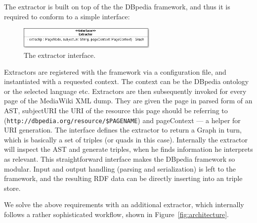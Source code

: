 The extractor is built on top of the the DBpedia framework, and thus it is required to conform to a simple interface:

\begin{figure}[tb]
\centering
\includegraphics[width=0.6\textwidth]{./images/interface.png}
\caption{The extractor interface.}
\label{fig:interface}
\end{figure}

Extractors are registered with the framework via a configuration file, and instantiated with a requested context. The context can be the DBpedia ontology or the selected language etc. Extractors are then subsequently invoked for every page of the MediaWiki XML dump. They are given the page in parsed form of an AST, subjectURI the URI of the resource this page should be referring to (\texttt{http://dbpedia.org/resource/\$PAGENAME}) and pageContext --- a helper for URI generation. The interface defines the extractor to return a Graph in turn, which is basically a set of triples (or quads in this case). Internally the extractor will inspect the AST and generate triples, when he finds information he interprets as relevant. This straightforward interface makes the DBpedia framework so modular. Input and output handling (parsing and serialization) is left to the framework, and the resulting RDF data can be directly inserting into an triple store.

We solve the above requirements with an additional extractor, which internally follows a rather sophisticated workflow, shown in Figure~\ref{fig:architecture}.

